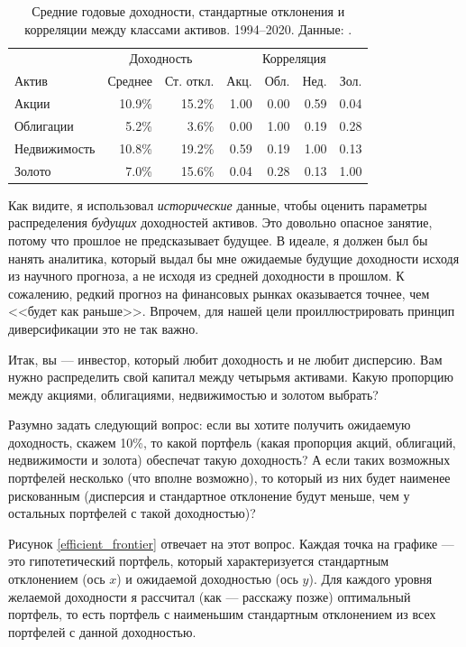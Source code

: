 \begin{table}[h]
\centering
\begin{tabular}{l|r|r|r|r|r|r}
 & \multicolumn{2}{c|}{Доходность} & \multicolumn{4}{c}{Корреляция} \\ 
\cline{2-7}
Актив        & Среднее & Ст. откл. & Акц. & Обл. & Нед. & Зол. \\ \hline
Акции        & 10.9\%  & 15.2\%    & 1.00  & 0.00   & 0.59    & 0.04 \\
Облигации    & 5.2\%   & 3.6\%     & 0.00  & 1.00   & 0.19    & 0.28 \\
Недвижимость & 10.8\%  & 19.2\%    & 0.59  & 0.19   & 1.00    & 0.13 \\
Золото       & 7.0\%   & 15.6\%    & 0.04  & 0.28   & 0.13    & 1.00
\end{tabular}
\caption{Средние годовые доходности, стандартные отклонения и корреляции между 
классами активов. 1994--2020. Данные: \cite{portfolio2020}.}
\label{asset_class_returns_table}
\end{table}

Как видите, я использовал \emph{исторические} данные, чтобы оценить параметры 
распределения \emph{будущих} доходностей активов. Это довольно опасное занятие, 
потому что прошлое не предсказывает будущее. В идеале, я должен был бы нанять 
аналитика, который выдал бы мне ожидаемые будущие доходности исходя из научного 
прогноза, а не исходя из средней доходности в прошлом. К сожалению, редкий 
прогноз на финансовых рынках оказывается точнее, чем <<будет как раньше>>. 
Впрочем, для нашей цели проиллюстрировать принцип диверсификации это не так 
важно.

Итак, вы --- инвестор, который любит доходность и не любит дисперсию. Вам нужно 
распределить свой капитал между четырьмя активами. Какую пропорцию между 
акциями, облигациями, недвижимостью и золотом выбрать?

Разумно задать следующий вопрос: если вы хотите получить ожидаемую доходность, 
скажем 10\%, то какой портфель (какая пропорция акций, облигаций, недвижимости и 
золота) обеспечат такую доходность? А если таких возможных портфелей несколько 
(что вполне возможно), то который из них будет наименее рискованным (дисперсия и 
стандартное отклонение будут меньше, чем у остальных портфелей с такой 
доходностью)?

Рисунок \ref{efficient_frontier} отвечает на этот вопрос. Каждая точка на 
графике --- это гипотетический портфель, который характеризуется стандартным 
отклонением (ось $x$) и ожидаемой доходностью (ось $y$). Для каждого уровня 
желаемой доходности я рассчитал (как --- расскажу позже) оптимальный портфель, 
то есть портфель с наименьшим стандартным отклонением из всех портфелей с данной 
доходностью.

